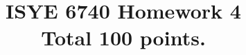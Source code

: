 \documentclass[twoside,10pt]{article}
\begin{document}
\title{ISYE 6740 Homework 4\\ 
\small Total 100 points.}
\date{}
\maketitle



\end{document}
